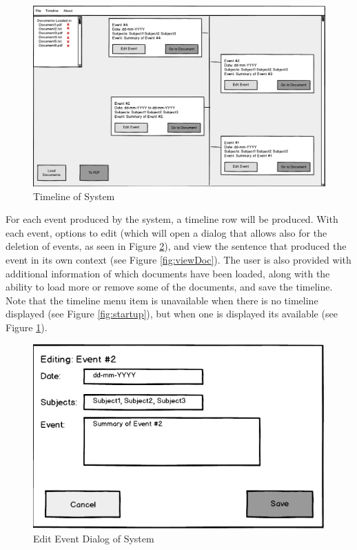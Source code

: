 \begin{figure}[h]
\caption{Timeline of System}
\label{fig:timeline}
\includegraphics[width=\linewidth]{timeline.png}
\centering
\end{figure}
\par For each event produced by the system, a timeline row will be produced. With each event, options to edit (which will open a dialog that allows also for the deletion of events, as seen in Figure \ref{fig:editDialog}), and view the sentence that produced the event in its own context (see Figure \ref{fig:viewDoc}). The user is also provided with additional information of which documents have been loaded, along with the ability to load more or remove some of the documents, and save the timeline. Note that the timeline menu item is unavailable when there is no timeline displayed (see Figure \ref{fig:startup}), but when one is displayed its available (see Figure \ref{fig:timeline}).
\begin{figure}[h]
\caption{Edit Event Dialog of System}
\label{fig:editDialog}
\includegraphics[scale=0.6]{editDialog.png}
\centering
\end{figure}
